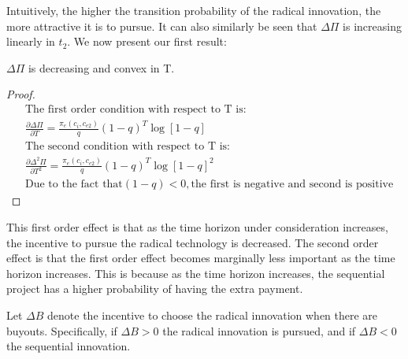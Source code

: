 Intuitively, the higher the transition probability of the radical innovation, the more attractive it is to pursue. It can also similarly be seen that $\Delta \Pi$ is increasing linearly in $t_2$. We now present our first result:  

\begin{proposition}
$\Delta \Pi$ is decreasing and convex in T.
\end{proposition}

\begin{proof}
\begin{align*}
&\text{The first order condition with respect to T is:} \\
&\frac{\partial \Delta \Pi}{\partial T}=\frac{\pi_{e}(c_i,c_{e2})}{q} (1-q)^{T} \log[1-q] \\
&\text{The second condition with respect to T is:} \\
&\frac{\partial \Delta^2 \Pi}{\partial T^2} = \frac{\pi_{e}(c_i,c_{e2})}{q} (1-q)^{T} \log[1-q]^2 \\
&\text{Due to the fact that} (1-q) <0, \text{the first is negative and second is positive}
\end{align*}
\end{proof}

This first order effect is that as the time horizon under consideration increases, the incentive to pursue the radical technology is decreased. The second order effect is that the first order effect becomes marginally less important as the time horizon increases. This is because as the time horizon increases, the sequential project has a higher probability of having the extra payment. 

\begin{definition}
Let $\Delta B$ denote the incentive to choose the radical innovation when there are buyouts. Specifically, if $\Delta B >0$ the radical innovation is pursued, and if $\Delta B <0$ the sequential innovation. 
\end{definition}

